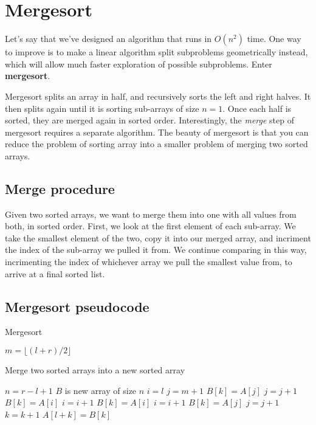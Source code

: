 \documentclass[titlepage, 12pt, leqno]{article}
\begin{document}
\section{Mergesort}
Let's say that we've designed an algorithm that runs in $O(n^{2})$ time. One
way to improve is to make a linear algorithm split subproblems geometrically
instead, which will allow much faster exploration of possible subproblems.
Enter \textbf{mergesort}.

Mergesort splits an array in half, and recursively sorts the left and right
halves. It then splits again until it is sorting sub-arrays of size $n=1$.
Once each half is sorted, they are merged again in sorted order. Interestingly,
the \textit{merge} step of mergesort requires a separate algorithm. The beauty
of mergesort is that you can reduce the problem of sorting array into a smaller
problem of merging two sorted arrays.

\subsection{Merge procedure}
Given two sorted arrays, we want to merge them into one with all values from
both, in sorted order. First, we look at the first element of each sub-array. We
take the smallest element of the two, copy it into our merged array, and
incriment the index of the sub-array we pulled it from. We continue comparing
in this way, incrimenting the index of whichever array we pull the smallest 
value from, to arrive at a final sorted list.

\subsection{Mergesort pseudocode}
\begin{algorithm}
\caption{Mergesort}
\begin{algorithmic}
        \State $m = \lfloor (l+r) / 2 \rfloor$
        \State {} 
        \State {} 
        \State {} 
    \EndIf
\EndProcedure 
\end{algorithmic}
\end{algorithm}
\begin{algorithm}
    \caption{Merge two sorted arrays into a new sorted array}
\begin{algorithmic}
    \State $n = r - l + 1$
    \State $B$ is new array of size $n$
    \State $i=l$
    \State $j = m+1$
        \State $B[k] = A[j]$
        \State $j = j+1$
        \State $B[k]= A[i]$
        \State $i = i+1$
        \State $B[k] = A[i]$
        \State $i = i+1$
        \Else
        \State $B[k] = A[j]$
        \State $j = j+1$
        \EndIf
        \State $k = k+1$
    \EndFor
    \State $A[l+k] = B[k]$
    \EndFor
\EndProcedure 
\end{algorithmic}
\end{algorithm}
\end{document}

